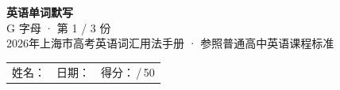 \documentclass[10pt,a4paper]{article}
\begin{document}
\pagestyle{plain}

\begin{center}
{\LARGE\bfseries 英语单词默写}\\[0.22em]
{\large G 字母 · 第 1 / 3 份}\\[0.18em]
{\small 2026年上海市高考英语词汇用法手册 · 参照普通高中英语课程标准}
\end{center}

\vspace{0.25em}
\noindent\begin{tabular}{@{}p{}@{}p{}@{}p{}@{}}
姓名：\underline{\hspace{2.0cm}} & 日期：\underline{\hspace{2.0cm}} & 得分：\underline{\hspace{1.3cm}}\,/\,50 \\
\end{tabular}

\vspace{0.3em}

\vspace{0.08em}
\end{document}
